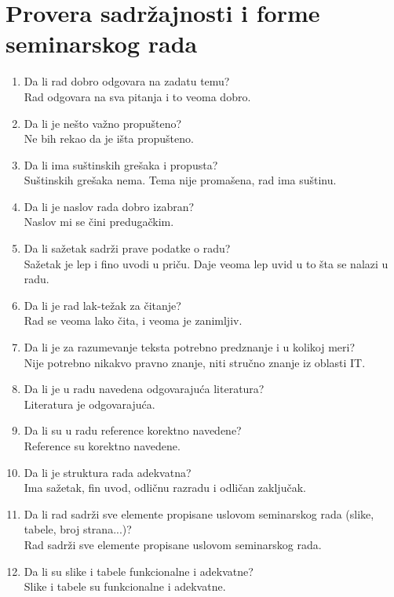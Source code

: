 \documentclass[a4paper]{article}
\begin{document}
\section{Provera sadržajnosti i forme seminarskog rada}

\begin{enumerate}
\item Da li rad dobro odgovara na zadatu temu?\\ Rad odgovara na sva pitanja i to veoma dobro.
\item Da li je nešto važno propušteno?\\ Ne bih rekao da je išta propušteno.
\item Da li ima suštinskih grešaka i propusta?\\ Suštinskih grešaka nema. Tema nije promašena, rad ima suštinu.
\item Da li je naslov rada dobro izabran?\\ Naslov mi se čini predugačkim.
\item Da li sažetak sadrži prave podatke o radu?\\ Sažetak je lep i fino uvodi u priču. Daje veoma lep uvid u to šta se nalazi u radu.
\item Da li je rad lak-težak za čitanje?\\ Rad se veoma lako čita, i veoma je zanimljiv.
\item Da li je za razumevanje teksta potrebno predznanje i u kolikoj meri?\\ Nije potrebno nikakvo pravno znanje, niti stručno znanje iz oblasti IT.
\item Da li je u radu navedena odgovarajuća literatura?\\ Literatura je odgovarajuća.
\item Da li su u radu reference korektno navedene?\\ Reference su korektno navedene.
\item Da li je struktura rada adekvatna?\\ Ima sažetak, fin uvod, odličnu razradu i odličan zaključak.
\item Da li rad sadrži sve elemente propisane uslovom seminarskog rada (slike, tabele, broj strana...)?\\ Rad sadrži sve elemente propisane uslovom seminarskog rada.
\item Da li su slike i tabele funkcionalne i adekvatne?\\ Slike i tabele su funkcionalne i adekvatne.
\end{enumerate}
\end{document}
